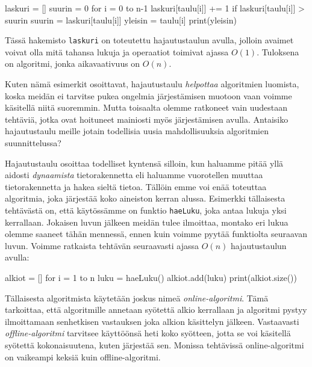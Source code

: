 \begin{code}
laskuri = []
suurin = 0
for i = 0 to n-1
    laskuri[taulu[i]] += 1
    if laskuri[taulu[i]] > suurin
        suurin = laskuri[taulu[i]]
        yleisin = taulu[i]
print(yleisin)
\end{code}

Tässä hakemisto \texttt{laskuri}
on toteutettu hajautustaulun avulla,
jolloin avaimet voivat olla mitä tahansa lukuja
ja operaatiot toimivat ajassa $O(1)$.
Tuloksena on algoritmi, jonka aikavaativuus on $O(n)$.

Kuten nämä esimerkit osoittavat, hajautustaulu
\emph{helpottaa} algoritmien luomista,
koska meidän ei tarvitse pukea ongelmia järjestämisen muotoon
vaan voimme käsitellä niitä suoremmin.
Mutta toisaalta olemme ratkoneet vain uudestaan tehtäviä,
jotka ovat hoituneet mainiosti myös järjestämisen avulla.
Antaisiko hajautustaulu meille jotain todellisia uusia
mahdollisuuksia algoritmien suunnittelussa?

Hajautustaulu osoittaa todelliset kyntensä silloin,
kun haluamme pitää yllä aidosti \emph{dynaamista}
tietorakennetta eli haluamme vuorotellen muuttaa
tietorakennetta ja hakea sieltä tietoa.
Tällöin emme voi enää toteuttaa algoritmia,
joka järjestää koko aineiston kerran alussa.
Esimerkki tällaisesta tehtävästä on,
että käytössämme on funktio \texttt{haeLuku},
joka antaa lukuja yksi kerrallaan.
Jokaisen luvun jälkeen meidän tulee ilmoittaa,
montako eri lukua olemme saaneet tähän mennessä,
ennen kuin voimme pyytää funktiolta seuraavan luvun.
Voimme ratkaista tehtävän seuraavasti ajassa $O(n)$
hajautustaulun avulla:

\begin{code}
alkiot = []
for i = 1 to n
    luku = haeLuku()
    alkiot.add(luku)
    print(alkiot.size())
\end{code}


Tällaisesta algoritmista käytetään joskus nimeä
\emph{online-algoritmi}.
Tämä tarkoittaa, että algoritmille annetaan syötettä
alkio kerrallaan ja algoritmi pystyy ilmoittamaan senhetkisen
vastauksen joka alkion käsittelyn jälkeen.
Vastaavasti \emph{offline-algoritmi} tarvitsee
käyttöönsä heti koko syötteen,
jotta se voi käsitellä syötettä kokonaisuutena,
kuten järjestää sen.
Monissa tehtävissä online-algoritmi on vaikeampi
keksiä kuin offline-algoritmi.
